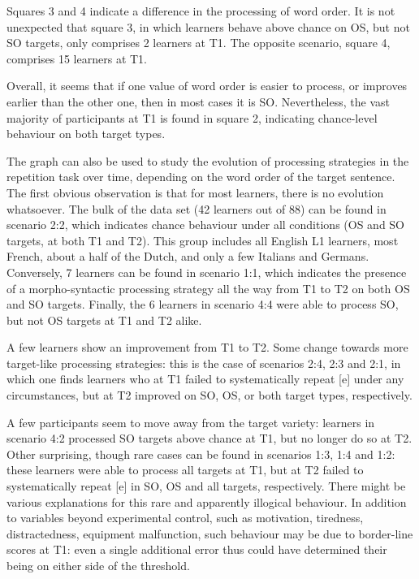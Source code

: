 Squares 3 and 4 indicate a difference in the processing of word order. It is not unexpected that square 3, in which learners behave above chance on OS, but not SO targets, only comprises 2 learners at T1. The opposite scenario, square 4, comprises 15 learners at T1. 

Overall, it seems that if one value of word order is easier to process, or improves earlier than the other one, then in most cases it is SO. Nevertheless, the vast majority of participants at T1 is found in square 2, indicating chance-level behaviour on both target types.

The graph can also be used to study the evolution of processing strategies in the repetition task over time, depending on the word order of the target sentence. The first obvious observation is that for most learners, there is no evolution whatsoever. The bulk of the data set (42 learners out of 88) can be found in scenario 2:2, which indicates chance behaviour under all conditions (OS and SO targets, at both T1 and T2). This group includes all English L1 learners, most French, about a half of the Dutch, and only a few Italians and Germans. Conversely, 7 learners can be found in scenario 1:1, which indicates the presence of a morpho-syntactic processing strategy all the way from T1 to T2 on both OS and SO targets. Finally, the 6 learners in scenario 4:4 were able to process SO, but not OS targets at T1 and T2 alike.

A few learners show an improvement from T1 to T2. Some change towards more target-like processing strategies: this is the case of scenarios 2:4, 2:3 and 2:1, in which one finds learners who at T1 failed to systematically repeat [e] under any circumstances, but at T2 improved on SO, OS, or both target types, respectively. 

A few participants seem to move away from the target variety: learners in scenario 4:2 processed SO targets above chance at T1, but no longer do so at T2. Other surprising, though rare cases can be found in scenarios 1:3, 1:4 and 1:2: these learners were able to process all targets at T1, but at T2 failed to systematically repeat [e] in SO, OS and all targets, respectively. There might be various explanations for this rare and apparently illogical behaviour. In addition to variables beyond experimental control, such as motivation, tiredness, distractedness, equipment malfunction, such behaviour may be due to border-line scores at T1: even a single additional error thus could have determined their being on either side of the threshold. 

